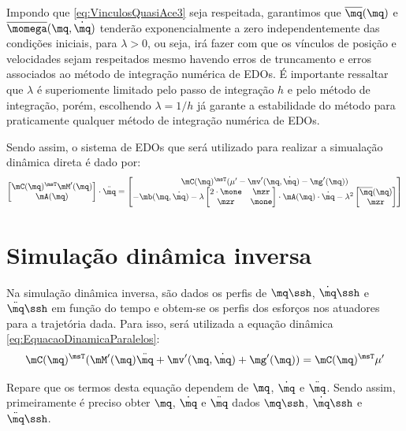 \documentclass[]{politex}
\begin{document}
Impondo que \eqref{eq:VinculosQuasiAce3} seja respeitada, garantimos que $\overline{\mq}(\mq)$ e $\overline{\momega}(\mq, \dot{\mq})$ tenderão exponencialmente a zero independentemente das condições iniciais, para $\lambda > 0$, ou seja, irá fazer com que os vínculos de posição e velocidades sejam respeitados mesmo havendo erros de truncamento e erros associados ao método de integração numérica de EDOs. É importante ressaltar que $\lambda$ é superiomente limitado pelo passo de integração $h$ e pelo método de integração, porém, escolhendo $\lambda = 1/h$ já garante a estabilidade do método para praticamente qualquer método de integração numérica de EDOs.

Sendo assim, o sistema de EDOs que será utilizado para realizar a simualação dinâmica direta é dado por:
\begin{equation}
\begin{bmatrix}
\mC(\mq)^\msT \mM'(\mq) \\
\mA(\mq)
\end{bmatrix}
\cdot
\ddot{\mq}
=
\begin{bmatrix}
\mC(\mq)^\msT (\mu' - \mv'(\mq,\dot{\mq}) - \mg'(\mq) ) \\
-\mb(\mq,\dot{\mq}) -
\lambda
\begin{bmatrix}
2 \cdot \mone & \mzr \\
\mzr & \mone
\end{bmatrix}
\cdot
\mA(\mq) \cdot \dot{\mq} -
\lambda^2
\begin{bmatrix}
\overline{\mq}(\mq) \\
\mzr
\end{bmatrix} 
\end{bmatrix}
\end{equation}

\section{Simulação dinâmica inversa} 

Na simulação dinâmica inversa, são dados os perfis de $\mq\ssh$, $\dot{\mq}\ssh$ e $\ddot{\mq}\ssh$ em função do tempo e obtem-se os perfis dos esforços nos atuadores para a trajetória dada. Para isso, será utilizada a equação dinâmica \eqref{eq:EquacaoDinamicaParalelos}:
$$ \mC(\mq)^\msT (   \mM'(\mq)\ddot{\mq} + \mv'(\mq,\dot{\mq}) + \mg'(\mq) ) = \mC(\mq)^\msT \mu' $$

Repare que os termos desta equação dependem de $\mq$, $\dot{\mq}$ e $\ddot{\mq}$. Sendo assim, primeiramente é preciso obter $\mq$, $\dot{\mq}$ e $\ddot{\mq}$ dados $\mq\ssh$, $\dot{\mq}\ssh$ e $\ddot{\mq}\ssh$.
\end{document}
